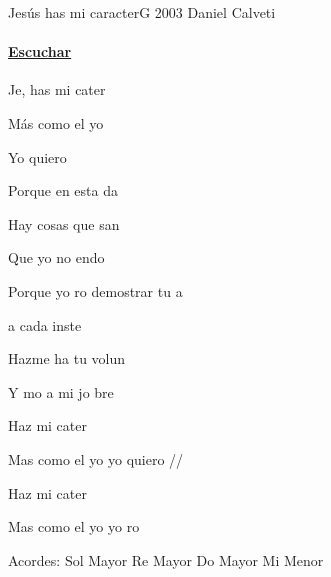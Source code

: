 \documentclass[12pt, spanish]{book}
\newcommand{\NotCCLIed}{\relax}
\begin{document}
    \begin{song}{Jesús has mi caracter}{G}
        {2003} %
        {Daniel Calveti}
        {} %
        {} %
        \ifChordBk
        \paragraph{\mbox{}\hfill\protect\href{https://open.spotify.com/intl-es/track/3cqQX5zJVW1wv6vzhz9qzP}{Escuchar}\mbox{}\hfill}
        \fi


        \begin{SBOpGroup}
            Je, has mi cater

            Más como el yo

            Yo quiero 
        \end{SBOpGroup}

        \begin{SBChorus}
            Porque en esta da

            Hay cosas que san

            Que yo no endo

            Porque yo ro demostrar tu a

            a cada inste

            Hazme ha tu volun

            Y mo a mi jo bre

            Haz mi cater

            Mas como el yo yo quiero //
        \end{SBChorus}

        \begin{SBOpGroup}
            Haz mi cater

            Mas como el yo yo ro 
        \end{SBOpGroup}

        \ifChordBk
        \begin{SBOpGroup}
            Acordes:\break
            \upchord{\G}\qquad Sol Mayor \hfill
            \upchord{\D}\qquad Re Mayor \hfill\null\break
            \upchord{\C}\qquad Do Mayor \hfill
            \upchord{\Em}\qquad Mi Menor \hfill\null\break
        \end{SBOpGroup}

        \fi
    \end{song}
\end{document}
